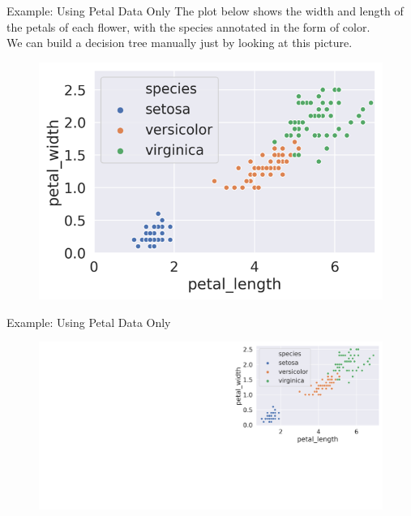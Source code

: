 \documentclass[aspectratio=169]{../latex_main/tntbeamer}  %
\begin{document}
	
	\begin{frame}{Example: Using Petal Data Only}
	    The plot below shows the width and length of the petals of each flower, with the species annotated in the form of color.\\
	    \bigskip
	    We can build a decision tree manually just by looking at this picture.
	    \begin{figure}
	        \centering
	        \includegraphics[scale=.65]{Bild3}
	    \end{figure}
	\end{frame}
	
	\begin{frame}{Example: Using Petal Data Only}
	    \begin{figure}
	        \includegraphics[scale=.34]{Bild5}
	    \end{figure}
	\end{frame}
	
\end{document}
